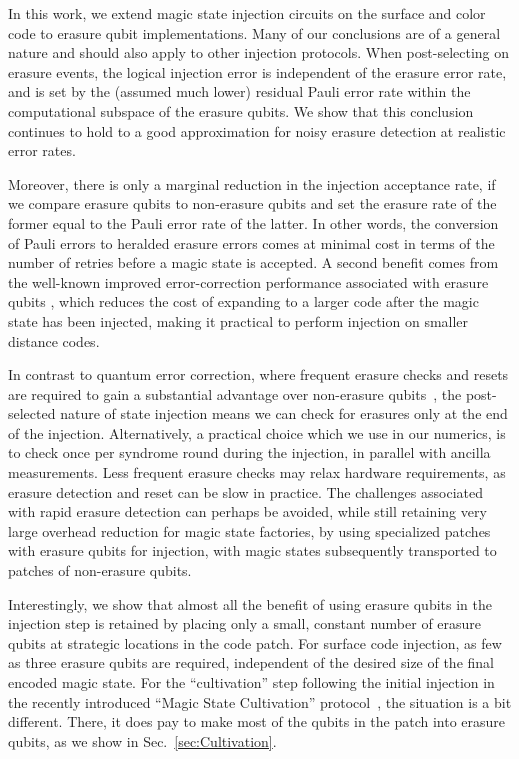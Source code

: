 \documentclass[twocolumn,
notitlepage,
aps,
prx,
floatfix,
superscriptaddress
]{revtex4-2}
\begin{document}
In this work, we extend magic state injection circuits on the surface \cite{bravyi1998quantum, dennis2002topological,kitaev2003fault,li2015magic, lao2022magic, gidney_hook_injection} and color code \cite{chamberland2020very, gidney2024magic} to erasure qubit implementations. Many of our conclusions are of a general nature and should also apply to other injection protocols.
When post-selecting on erasure events, the logical injection error is independent of the erasure error rate, and is set by the (assumed much lower) residual Pauli error rate within the computational subspace of the erasure qubits. We show that this conclusion continues to hold to a good approximation for noisy erasure detection at realistic error rates.

Moreover, there is only a marginal reduction in the injection acceptance rate, if we compare erasure qubits to non-erasure qubits and set the erasure rate of the former equal to the Pauli error rate of the latter.
In other words, the conversion of Pauli errors to heralded erasure errors comes at minimal cost in terms of the number of retries before a magic state is accepted.
A second benefit comes from the well-known improved error-correction performance associated with erasure qubits \cite{Wu_2022atoms, Kubica_2023}, which reduces the cost of expanding to a larger code after the magic state has been injected, making it practical to perform injection on smaller distance codes. 


In contrast to quantum error correction, where frequent erasure checks and resets are required to gain a substantial advantage over non-erasure qubits~\cite{Bailey_optimization_2024}, the post-selected nature of state injection means we can check for erasures only at the end of the injection. Alternatively, a practical choice which we use in our numerics, is to check once per syndrome round during the injection, in parallel with ancilla measurements.
Less frequent erasure checks may relax hardware requirements, as erasure detection and reset can be slow in practice.
The challenges associated with rapid erasure detection can perhaps be avoided, while still retaining very large overhead reduction for magic state factories, by using specialized patches with erasure qubits for injection, with magic states subsequently transported to patches of non-erasure qubits.

Interestingly, we show that almost all the benefit of using erasure qubits in the injection step is retained by placing only a small, constant number of erasure qubits at strategic locations in the code patch. For surface code injection, as few as three erasure qubits are required, independent of the desired size of the final encoded magic state. For the ``cultivation'' step following the initial injection in 
 the recently introduced ``Magic State Cultivation'' protocol~\cite{gidney2024magic}, the situation is a bit different. There, it does pay to make most of the qubits in the patch into erasure qubits, as we show in Sec.~\ref{sec:Cultivation}.
\end{document}
